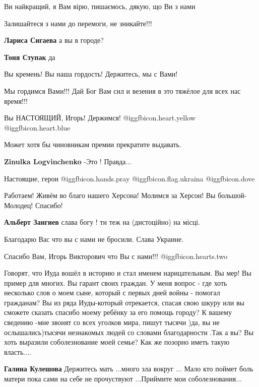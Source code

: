 \begin{itemize}
Ви найкращий, я Вам вірю, пишаємось, дякую, що Ви з нами

Залишайтеся з нами до перемоги, не зникайте!!!

\textbf{Лариса Сигаева} а вы в городе?

\textbf{Тоня Ступак} да

Вы кремень! Вы наша гордость! Держитесь, мы с Вами!

Мы гордимся Вами!!! Дай Бог Вам сил и везения в это тяжёлое для всех нас время!!!

Вы НАСТОЯЩИЙ, Игорь! Держимся! @igg{fbicon.heart.yellow}  @igg{fbicon.heart.blue} 

Может хотя бы чиновникам премии прекратите выдавать.


\textbf{Zinulka Logvinchenko} -Это ! Правда...

Настоящие, герои @igg{fbicon.hands.pray} @igg{fbicon.flag.ukraina} @igg{fbicon.dove} ️

Работаем! Живём во благо нашего Херсона! Молимся за Херсон! Вы большой- Молодец! Спасибо!

\textbf{Альберт Зангиев} слава богу ! ти теж на (дистоційно) на місці.

Благодарю Вас что вы с нами не бросили. Слава Украине.

Спасибо Вам, Игорь Викторович что Вы с нами!!! @igg{fbicon.hearts.two} 


Говорят, что Иуда вошёл в историю и стал именем нарицательным. Вы мер! Вы пример
для многих. Вы гарант своих граждан. У меня вопрос - где хоть несколько слов о моем
сыне, который с первых дней войны - помогал гражданам? Вы из ряда Иуды-который
отрекается, спасая свою шкуру или вы сможете сказать спасибо моему ребёнку за
его помощь городу? К вашему сведению -мне звонят со всех уголков мира, пишут
тысячи )да, вы не ослышались)тысячи незнакомых людей со словами благодарности
.Так а вы? Вы хоть выразили соболезнование моей семье? Как же позорно иметь
такую власть....

\textbf{Галина Кулешова} Держитесь мать ...много зла вокруг ... Мало кто поймет боль матери пока сами на себе не прочуствуют ...Приймите мои соболезнования...


\end{itemize}
